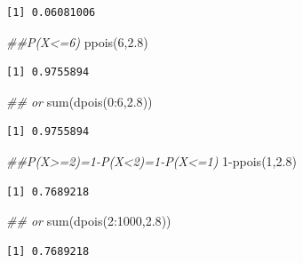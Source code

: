 \documentclass[
  letterpaper,
  DIV=11,
  numbers=noendperiod]{scrreprt}
\newenvironment{Shaded}{\begin{snugshade}}{\end{snugshade}}
\newcommand{\DecValTok}[1]{\textcolor[rgb]{0.68,0.00,0.00}{#1}}
\newcommand{\DocumentationTok}[1]{\textcolor[rgb]{0.37,0.37,0.37}{\textit{#1}}}
\newcommand{\FloatTok}[1]{\textcolor[rgb]{0.68,0.00,0.00}{#1}}
\newcommand{\FunctionTok}[1]{\textcolor[rgb]{0.28,0.35,0.67}{#1}}
\newcommand{\NormalTok}[1]{\textcolor[rgb]{0.00,0.23,0.31}{#1}}
\newcommand{\SpecialCharTok}[1]{\textcolor[rgb]{0.37,0.37,0.37}{#1}}
\begin{document}
\begin{verbatim}
[1] 0.06081006
\end{verbatim}

\begin{Shaded}
\begin{Highlighting}[]
\DocumentationTok{\#\#P(X\textless{}=6)}
\FunctionTok{ppois}\NormalTok{(}\DecValTok{6}\NormalTok{,}\FloatTok{2.8}\NormalTok{)}
\end{Highlighting}
\end{Shaded}

\begin{verbatim}
[1] 0.9755894
\end{verbatim}

\begin{Shaded}
\begin{Highlighting}[]
\DocumentationTok{\#\# or}
\FunctionTok{sum}\NormalTok{(}\FunctionTok{dpois}\NormalTok{(}\DecValTok{0}\SpecialCharTok{:}\DecValTok{6}\NormalTok{,}\FloatTok{2.8}\NormalTok{))}
\end{Highlighting}
\end{Shaded}

\begin{verbatim}
[1] 0.9755894
\end{verbatim}

\begin{Shaded}
\begin{Highlighting}[]
\DocumentationTok{\#\#P(X\textgreater{}=2)=1{-}P(X\textless{}2)=1{-}P(X\textless{}=1)}
\DecValTok{1}\SpecialCharTok{{-}}\FunctionTok{ppois}\NormalTok{(}\DecValTok{1}\NormalTok{,}\FloatTok{2.8}\NormalTok{)}
\end{Highlighting}
\end{Shaded}

\begin{verbatim}
[1] 0.7689218
\end{verbatim}

\begin{Shaded}
\begin{Highlighting}[]
\DocumentationTok{\#\# or}
\FunctionTok{sum}\NormalTok{(}\FunctionTok{dpois}\NormalTok{(}\DecValTok{2}\SpecialCharTok{:}\DecValTok{1000}\NormalTok{,}\FloatTok{2.8}\NormalTok{))}
\end{Highlighting}
\end{Shaded}

\begin{verbatim}
[1] 0.7689218
\end{verbatim}
\end{document}
